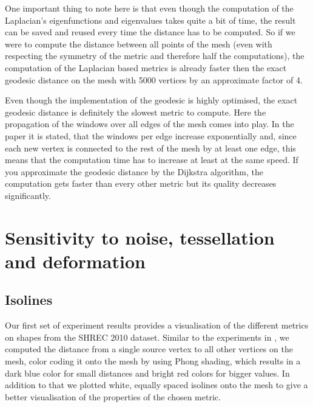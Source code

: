 One important thing to note here is that even though the computation of the Laplacian's eigenfunctions and eigenvalues takes quite a bit of time, the result can be saved and reused every time the distance has to be computed.
So if we were to compute the distance between all points of the mesh (even with respecting the symmetry of the metric and therefore half the computations), the computation of the Laplacian based metrics is already faster then the exact geodesic distance on the mesh with 5000 vertices by an approximate factor of 4.

Even though the implementation of the geodesic is highly optimised, the exact geodesic distance is definitely the slowest metric to compute.
Here the propagation of the windows over all edges of the mesh comes into play.
In the paper \cite{surazhsky2005fast} it is stated, that the windows per edge increase exponentially and, since each new vertex is connected to the rest of the mesh by at least one edge, this means that the computation time has to increase at least at the same speed.
If you approximate the geodesic distance by the Dijkstra algorithm, the computation gets faster than every other metric but its quality decreases significantly.

\section{Sensitivity to noise, tessellation and deformation}

\subsection{Isolines}
Our first set of experiment results provides a visualisation of the different metrics on shapes from the SHREC 2010 dataset.
Similar to the experiments in \cite{lipman2010biharmonic}, we computed the distance from a single source vertex to all other vertices on the mesh, color coding it onto the mesh by using Phong shading, which results in a dark blue color for small distances and bright red colors for bigger values.
In addition to that we plotted white, equally spaced isolines onto the mesh to give a better visualisation of the properties of the chosen metric.

